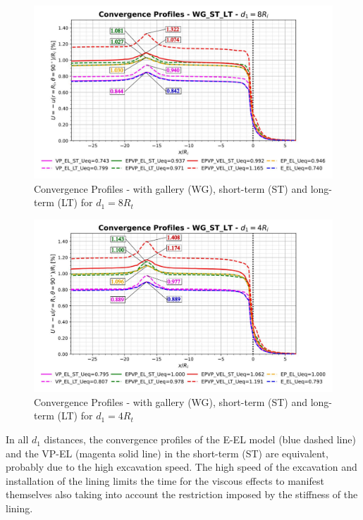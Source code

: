 \documentclass[a4paper,fleqn]{cas-sc}
\begin{document}
\FloatBarrier
\begin{figure}[h!]
	\centering
	\includegraphics[scale=0.5]{Convergence Profiles - WG_ST_LT - $d_1=8R_i$.pdf}
	\caption{Convergence Profiles - with gallery (WG), short-term (ST) and long-term (LT) for $d_1 = 8R_t$}
	\label{WG-ST-LT-D1-8RI}
\end{figure}
\FloatBarrier
\begin{figure}[h!]
	\centering
	\includegraphics[scale=0.5]{Convergence Profiles - WG_ST_LT - $d_1=4R_i$.pdf}
	\caption{Convergence Profiles - with gallery (WG), short-term (ST) and long-term (LT) for $d_1 = 4R_t$}
	\label{WG-ST-LT-D1-4RI}
\end{figure}
\FloatBarrier
In all $d_1$ distances, the convergence profiles of the E-EL model (blue dashed line) and the VP-EL (magenta solid line) in the short-term (ST) are equivalent, probably due to the high excavation speed. The high speed of the excavation and installation of the lining limits the time for the viscous effects to manifest themselves also taking into account the restriction imposed by the stiffness of the lining.
\end{document}

